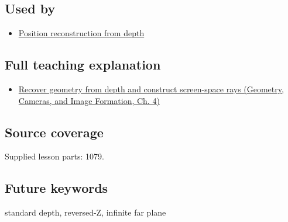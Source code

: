 \subsection{Used by}\label{appendix-1bc40b08db4a-used-by}

\hypertarget{appendix-1bc40b08db4a-used-by}{}

\begin{itemize}
\tightlist
\item
  \hyperref[appendix-2cbf2968e866]{Position reconstruction from depth}
\end{itemize}

\subsection{Full teaching explanation}\label{appendix-1bc40b08db4a-full-teaching-explanation}

\hypertarget{appendix-1bc40b08db4a-full-teaching-explanation}{}

\begin{itemize}
\tightlist
\item
  \href{../03-Geometry-Cameras-and-Image-Formation/main.pdf\#nameddest=02-foundations-ii-ch035-recover-geometry-from-depth-and-construct-screen-space-rays}{Recover geometry from depth and construct screen-space rays (Geometry, Cameras, and Image Formation, Ch. 4)}
\end{itemize}

\subsection{Source coverage}\label{appendix-1bc40b08db4a-source-coverage}

\hypertarget{appendix-1bc40b08db4a-source-coverage}{}

Supplied lesson parts: 1079.

\subsection{Future keywords}\label{appendix-1bc40b08db4a-future-keywords}

\hypertarget{appendix-1bc40b08db4a-future-keywords}{}

standard depth, reversed-Z, infinite far plane
